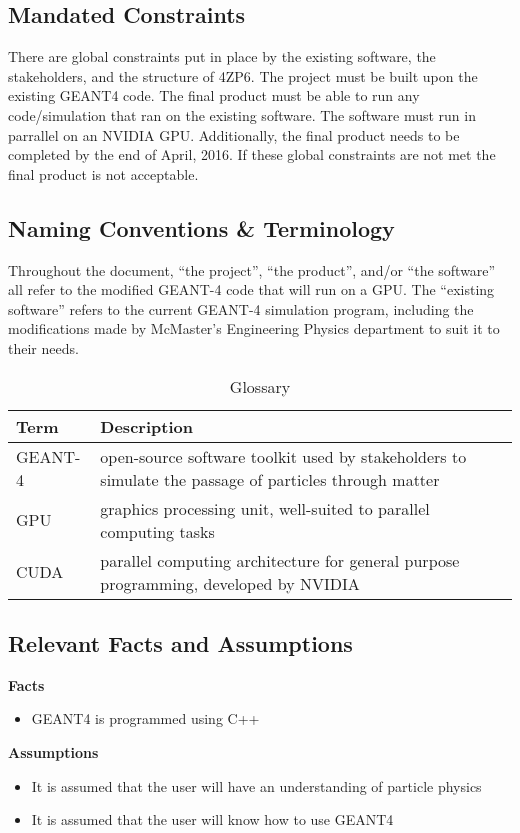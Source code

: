 \documentclass[12pt]{article}
\begin{document}
\subsection{Mandated Constraints} %
There are global constraints put in place by the existing software, the stakeholders, and the structure of 4ZP6. The project must be built upon the existing GEANT4 code. The final product must be able to run any code/simulation that ran on the existing software. The software must run in parrallel on an NVIDIA GPU. Additionally, the final product needs to be completed by the end of April, 2016. If these global constraints are not met the final product is not acceptable.\\

\subsection{Naming Conventions \& Terminology} %
Throughout the document, ``the project'', ``the product'', and/or ``the software'' all refer to the modified GEANT-4 code that will run on a GPU. The ``existing software'' refers to the current GEANT-4 simulation program, including the modifications made by McMaster's Engineering Physics department to suit it to their needs.\\

\begin{table}[h]
\centering
\begin{tabularx}{\textwidth}{|l|X|}
\hline
Term & Description\\
\hline
GEANT-4 & open-source software toolkit used by stakeholders to simulate the passage of particles through matter\\
GPU & graphics processing unit, well-suited to parallel computing tasks\\
CUDA & parallel computing architecture for general purpose programming, developed by NVIDIA\\
\hline
\end{tabularx}
\caption{Glossary}
\end{table}

\subsection{Relevant Facts and Assumptions} %
\textbf{Facts}
\begin{itemize}
	\item GEANT4 is programmed using C++
\end{itemize}
\textbf{Assumptions}
 \begin{itemize}
	\item It is assumed that the user will have an understanding of particle physics
	\item It is assumed that the user will know how to use GEANT4
\end{itemize}
\end{document}
